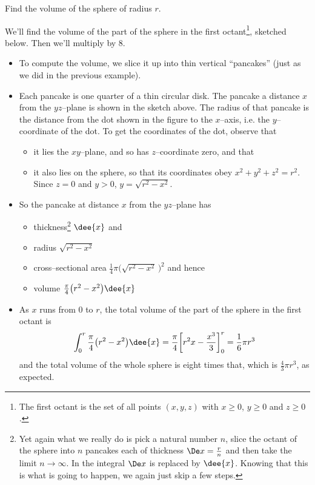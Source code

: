 \goodbreak
\begin{eg}[Sphere]\label{eg:VOLs}
Find the volume of the sphere of radius $r$.

\soln We'll find the volume of the part of the sphere in the first octant\footnote{The
first octant is the set of all points $(x,y,z)$ with $x\ge 0$, $y\ge 0$ and $z\ge 0$.},
sketched below. Then we'll multiply by $8$.

\begin{itemize}
 \item To compute the volume,
%
we slice it up into thin vertical ``pancakes'' (just as we did in the previous example).

\item Each pancake is one quarter of a thin circular disk. The pancake a distance $x$
from the $yz$--plane is shown in the sketch above. The radius of that pancake is the
distance from the dot shown in the figure to the $x$--axis, i.e. the $y$--coordinate
of the dot. To get the coordinates of the dot, observe that
\begin{itemize}
\item it lies the $xy$--plane, and so has $z$--coordinate zero,
and that
\item it also lies on the sphere, so that its coordinates obey
$x^2+y^2+z^2=r^2$. Since $z=0$ and $y>0$, $y=\sqrt{r^2-x^2}$.
\end{itemize}
\item So the pancake at distance $x$ from the $yz$--plane has
\begin{itemize}
\item thickness\footnote{Yet again what we really do is pick a natural
number $n$, slice the octant of the sphere into $n$ pancakes each of thickness
$\De x=\frac{r}{n}$ and then take the limit $n\rightarrow\infty$.
In the integral $\De x$ is replaced by $\dee{x}$. Knowing that this is what
is going to happen, we again just skip a few steps.} $\dee{x}$ and
\item
radius $\sqrt{r^2-x^2}$
\item cross--sectional area $\frac{1}{4}\pi \big(\sqrt{r^2-x^2}\,\big)^2$
and hence
\item
volume $\frac{\pi}{4} \big(r^2-x^2\big)\dee{x}$
\end{itemize}
\item As $x$ runs from $0$ to $r$, the total volume of the part of the sphere
in the first octant is
\begin{align*}
\int_0^r \frac{\pi}{4} \big(r^2-x^2\big)\dee{x}
=\frac{\pi}{4}\bigg[r^2x-\frac{x^3}{3}\bigg]_0^r
=\frac{1}{6}\pi r^3
\end{align*}
and the total volume of the whole sphere is eight times that, which is
$\frac{4}{3}\pi r^3$, as expected.
\end{itemize}
\end{eg}


